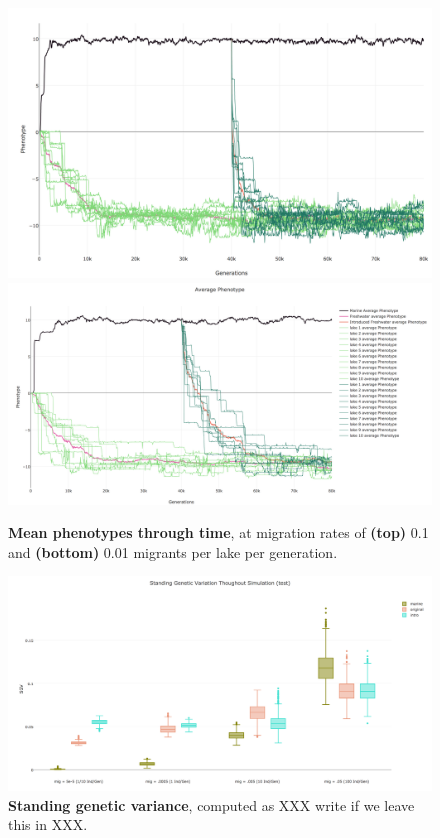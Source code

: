\documentclass{article}
\begin{document}
\begin{figure}
	\begin{center}
        \includegraphics[width=1.0\linewidth]{plotlyPlots/PhenotypeThroughout5e-4.png}
        \includegraphics[width=1.0\linewidth]{plotlyPlots/PhenotypeThroughout5e-5.png}
  		\caption{
            \textbf{Mean phenotypes through time},
            at migration rates of
            \textbf{(top)} 0.1 and
            \textbf{(bottom)} 0.01 migrants per lake per generation.
		}
  		\label{fig:pheno_by_time2}
	\end{center}
\end{figure}

\begin{figure}
	\begin{center}
        \includegraphics[width=1.0\linewidth]{plotlyPlots/StandingGeneticVariation.png}
  		\caption{
            \textbf{Standing genetic variance},
            computed as XXX write if we leave this in XXX.
		}
        \label{fig:SGV}
	\end{center}
\end{figure}
\end{document}
